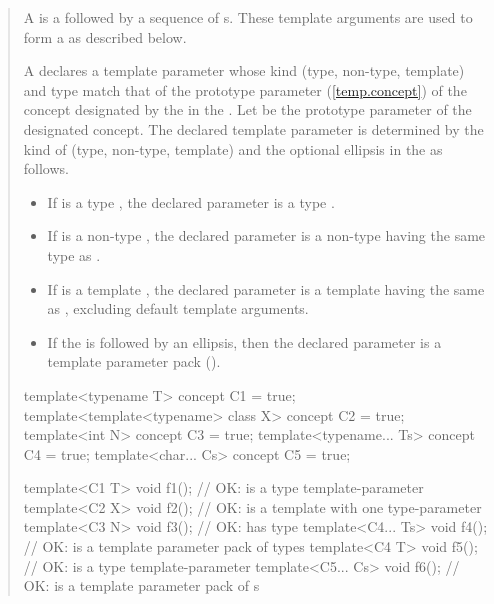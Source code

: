 \begin{quote}
\begin{addedblock}
\setcounter{Paras}{8}
\pnum
A  is a  followed 
by a sequence of s. These template arguments
are used to form a  as described below.

\pnum
A  declares a template parameter whose 
kind (type, non-type, template) and type match that of the prototype parameter 
(\ref{temp.concept}) of the concept designated by the 
 in the .
%
Let  be the prototype parameter of the designated concept.
% 
The declared template parameter is determined by the kind of  
(type, non-type, template) and the optional ellipsis in the
 as follows.
% 
\begin{itemize}
\item If  is a type , the declared
parameter is a type . 

\item If  is a non-type , the declared
parameter is a non-type  having the same 
type as .

\item If  is a template , the declared
parameter is a template  having the same 
 as , excluding default template 
arguments.

\item If the  is followed by an ellipsis,
then the declared parameter is a template parameter pack ().
\end{itemize}
% 
\enterexample
\begin{codeblock}
template<typename T> concept C1 = true;
template<template<typename> class X> concept C2 = true;
template<int N> concept C3 = true;
template<typename... Ts> concept C4 = true;
template<char... Cs> concept C5 = true;

template<C1 T> void f1();     // OK:  is a type template-parameter
template<C2 X> void f2();     // OK:  is a template with one type-parameter
template<C3 N> void f3();     // OK:  has type 
template<C4... Ts> void f4(); // OK:  is a template parameter pack of types
template<C4 T> void f5();     // OK:  is a type template-parameter
template<C5... Cs> void f6(); // OK:  is a template parameter pack of s
\end{codeblock}
\exitexample


\end{addedblock}
\end{quote}
